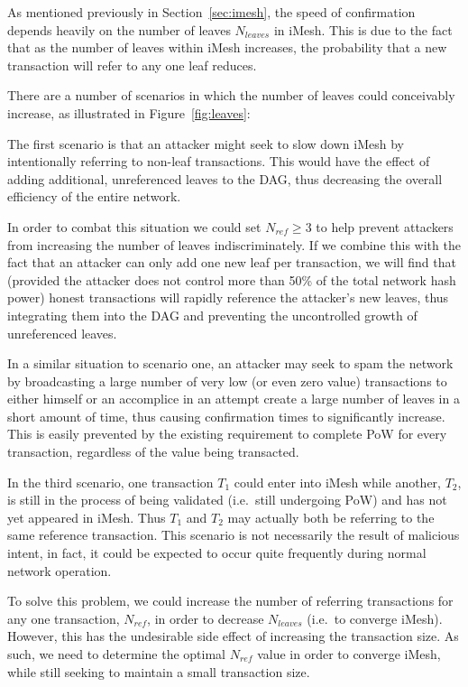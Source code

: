 \documentclass[a4paper,10pt,twocolumn]{article}
\begin{document}
As mentioned previously in Section~\ref{sec:imesh}, the speed of confirmation
depends heavily on the number of leaves \( N_{leaves} \) in iMesh. This is due to the fact that as the number of leaves within iMesh increases,
the probability that a new transaction will refer to any one leaf reduces. 

There are a number of scenarios in which the number of leaves could conceivably increase, as illustrated in Figure~\ref{fig:leaves}:

The first scenario is that an attacker might seek to slow down iMesh by intentionally referring to non-leaf transactions.
This would have the effect of adding additional, unreferenced leaves to the DAG, thus decreasing the overall efficiency of the entire network.

In order to combat this situation we could set \( N_{ref} \geq 3 \) to help prevent attackers from increasing the number of leaves indiscriminately.
If we combine this with the fact that an attacker can only add one new leaf per transaction, we will find that (provided the attacker does not control more than 50\% of the total network hash power) honest transactions will rapidly 
reference the attacker's new leaves, thus integrating them into the DAG and preventing the uncontrolled growth of unreferenced leaves.

In a similar situation to scenario one, an attacker may seek to spam the network by broadcasting a large number of very low (or even zero value) transactions to either himself or an accomplice in an attempt create a large number of leaves in a short 
amount of time, thus causing confirmation times to significantly increase. This is easily prevented by the existing requirement to complete PoW for every transaction, regardless of the value being transacted.

In the third scenario, one transaction \(T_1\) could enter into iMesh while another, \(T_2\), is still in the process of being validated (i.e.\ still undergoing PoW) and has not yet appeared in iMesh.
Thus \(T_1\) and \(T_2\) may actually both be referring to the same reference transaction.
This scenario is not necessarily the result of malicious intent, in fact, it could be expected to occur quite frequently during normal network operation.

To solve this problem, we could increase the number of referring transactions for any one transaction, \( N_{ref} \), in order 
to decrease \( N _{leaves} \) (i.e.\ to converge iMesh). However, this has the undesirable side effect of increasing the transaction size.
As such, we need to determine the optimal \( N_{ref} \) value in order to converge iMesh, while still seeking to maintain a small transaction size. 
\end{document}
